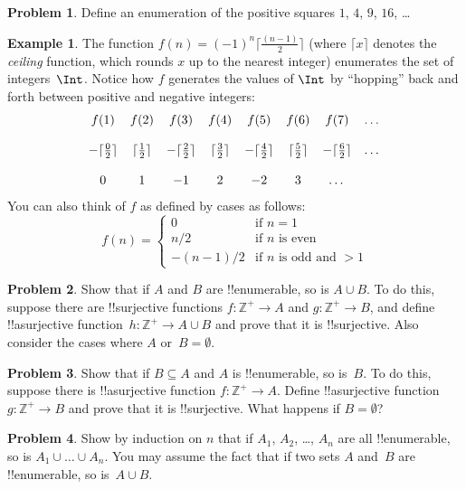 \documentclass[10pt,a4paper]{article}
\theoremstyle{plain}
\theoremstyle{definition}
\newtheorem{ex}[thm]{Example}
\newtheorem{prob}{Problem}[section]
\theoremstyle{remark}
\providecommand{\PosInt}{\mathbb{Z}^{+}}
\begin{document}
\begin{prob}
Define an enumeration of the positive squares $1$, $4$, $9$, $16$, \dots
\end{prob}

\begin{ex}
The function $f(n) = (-1)^{n} \lceil \frac{(n-1)}{2}\rceil$ (where
$\lceil x \rceil$ denotes the \emph{ceiling} function, which rounds
$x$ up to the nearest integer) enumerates the set of
integers~$\Int$. Notice how $f$ generates the values of $\Int$ by
``hopping'' back and forth between positive and negative integers:
\[
\begin{array}{c c c c c c c c}
f(1) & f(2) & f(3) & f(4) & f(5) & f(6) & f(7) & \dots \\ \\
- \lceil \tfrac{0}{2} \rceil & \lceil \tfrac{1}{2}\rceil & - \lceil \tfrac{2}{2} \rceil & \lceil \tfrac{3}{2} \rceil & - \lceil \tfrac{4}{2} \rceil  & \lceil \tfrac{5}{2}
\rceil & - \lceil \tfrac{6}{2} \rceil & \dots \\ \\
0 & 1 & -1 & 2 & -2 & 3 & \dots
\end{array}
\]
You can also think of $f$ as defined by cases as follows:
\[
f(n) = \begin{cases}
  0 & \text{if $n = 1$}\\
  n/2 & \text{if $n$ is even}\\
  -(n-1)/2 & \text{if $n$ is odd and $>1$}
  \end{cases}
\]
\end{ex}

\begin{prob}
  Show that if $A$ and $B$ are !!{enumerable}, so is $A \cup B$. To do
  this, suppose there are !!{surjective} functions $f\colon \PosInt \to
  A$ and $g\colon \PosInt \to B$, and define !!a{surjective}
  function~$h\colon \PosInt \to A \cup B$ and prove that it is
  !!{surjective}. Also consider the cases where $A$ or~$B = \emptyset$.
\end{prob}
  
\begin{prob}
  Show that if $B \subseteq A$ and $A$ is !!{enumerable}, so is~$B$. To
  do this, suppose there is !!a{surjective} function $f\colon \PosInt \to
  A$. Define !!a{surjective} function~$g\colon \PosInt \to B$ and prove
  that it is !!{surjective}. What happens if $B = \emptyset$?
\end{prob}
    
\begin{prob}
  Show by induction on $n$ that if $A_1$, $A_2$, \dots, $A_n$ are all
  !!{enumerable}, so is $A_1 \cup \dots \cup A_n$. You may assume the
  fact that if two sets $A$ and~$B$ are !!{enumerable}, so is~$A \cup
  B$. 
\end{prob}
\end{document}
